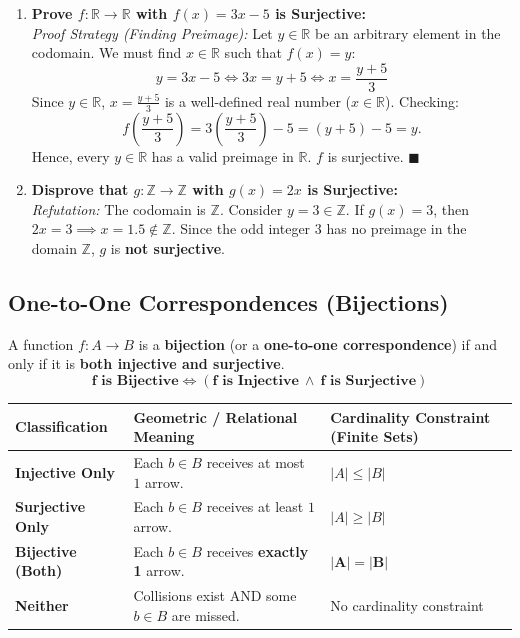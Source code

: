 \documentclass[11pt,a4paper]{article}
\begin{document}
\begin{examplebox}
\begin{enumerate}
    \item \textbf{Prove $f: \mathbb{R} \to \mathbb{R}$ with $f(x) = 3x - 5$ is Surjective:}\\
    \textit{Proof Strategy (Finding Preimage):} Let $y \in \mathbb{R}$ be an arbitrary element in the codomain. We must find $x \in \mathbb{R}$ such that $f(x) = y$:
    \[
    y = 3x - 5 \iff 3x = y + 5 \iff x = \frac{y + 5}{3}
    \]
    Since $y \in \mathbb{R}$, $x = \frac{y+5}{3}$ is a well-defined real number ($x \in \mathbb{R}$). Checking:
    \[
    f\left(\frac{y+5}{3}\right) = 3\left(\frac{y+5}{3}\right) - 5 = (y + 5) - 5 = y.
    \]
    Hence, every $y \in \mathbb{R}$ has a valid preimage in $\mathbb{R}$. $f$ is surjective. $\blacksquare$

    \item \textbf{Disprove that $g: \mathbb{Z} \to \mathbb{Z}$ with $g(x) = 2x$ is Surjective:}\\
    \textit{Refutation:} The codomain is $\mathbb{Z}$. Consider $y = 3 \in \mathbb{Z}$. If $g(x) = 3$, then $2x = 3 \implies x = 1.5 \notin \mathbb{Z}$. Since the odd integer $3$ has no preimage in the domain $\mathbb{Z}$, $g$ is \textbf{not surjective}.
\end{enumerate}
\end{examplebox}

\subsection{One-to-One Correspondences (Bijections)}

\begin{defbox}
A function $f: A \to B$ is a \textbf{bijection} (or a \textbf{one-to-one correspondence}) if and only if it is \textbf{both injective and surjective}.
\[
\mathbf{f \text{ is Bijective}} \iff (\mathbf{f \text{ is Injective}} \ \land \ \mathbf{f \text{ is Surjective}})
\]
\end{defbox}

\begin{center}
\renewcommand{\arraystretch}{1.2}
\begin{tabularx}{\linewidth}{@{}l X X@{}}
\toprule
\rowcolor{navy!15}
\textbf{\color{navy}Classification} & \textbf{\color{navy}Geometric / Relational Meaning} & \textbf{\color{navy}Cardinality Constraint (Finite Sets)} \\
\midrule
\textbf{Injective Only} & Each $b \in B$ receives at most $1$ arrow. & $|A| \le |B|$ \\
\textbf{Surjective Only} & Each $b \in B$ receives at least $1$ arrow. & $|A| \ge |B|$ \\
\rowcolor{lightteal!60}
\textbf{Bijective (Both)} & Each $b \in B$ receives \textbf{exactly 1} arrow. & $\mathbf{|A| = |B|}$ \\
\textbf{Neither} & Collisions exist AND some $b \in B$ are missed. & No cardinality constraint \\
\bottomrule
\end{tabularx}
\end{center}
\end{document}
